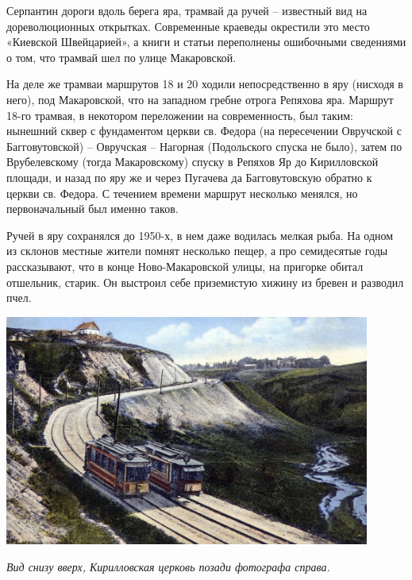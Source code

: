 Серпантин дороги вдоль берега яра, трамвай да ручей – известный вид на дореволюционных открытках. Современные краеведы окрестили это место «Киевской Швейцарией», а книги и статьи переполнены ошибочными сведениями о том, что трамвай шел по улице Макаровской.

На деле же трамваи маршрутов 18 и 20 ходили непосредственно в яру (нисходя в него), под Макаровской, что на западном гребне отрога Репяхова яра. Маршрут 18-го трамвая, в некотором переложении на современность, был таким: нынешний сквер с фундаментом церкви св. Федора (на пересечении Овручской с Багговутовской) – Овручская – Нагорная (Подольского спуска не было), затем по Врубелевскому (тогда Макаровскому) спуску в Репяхов Яр до Кирилловской площади, и назад по яру же и через Пугачева да Багговутовскую обратно к церкви св. Федора. С течением времени маршрут несколько менялся, но первоначальный был именно таков.

Ручей в яру сохранялся до 1950-х, в нем даже водилась мелкая рыба. На одном из склонов местные жители помнят несколько пещер, а про семидесятые годы рассказывают, что в конце Ново-Макаровской улицы, на пригорке обитал отшельник, старик. Он выстроил себе приземистую хижину из бревен и разводил пчел.






\vspace*{\fill}

\begin{center}
\includegraphics[width=0.90\textwidth]{chast-zmiy/kurilo/s-r09.jpg}

\textit{Вид снизу вверх, Кирилловская церковь позади фотографа справа.}
\end{center}

